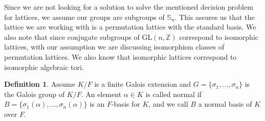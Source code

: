 \documentclass{article}
\theoremstyle{plain}
\theoremstyle{definition}
\newtheorem{definition}[theorem]{Definition}
\newcommand{\Z}{\ensuremath{\mathbb{Z}}}
\newcommand{\Q}{\ensuremath{\mathbb{Q}}}
\begin{document}
Since we are not looking for a solution to solve the mentioned decision problem for lattices, we assume our groups are subgroups of $\mathbb{S}_n$. This assures us that the lattice we are working with is a permutation lattice with the standard basis. We also note that since conjugate subgroups of $\mathrm{GL}(n,\Z)$ correspond to isomorphic lattices, with our assumption we are discussing isomorphism classes of permutation lattices. We also know that isomorphic lattices correspond to isomorphic algebraic tori.
%
%
\begin{definition}
Assume $K/F$ is a finite Galois extension and $G = \lbrace \sigma_1, \ldots , \sigma_n \rbrace$ is the Galois group of $K/F$. An element $\alpha \in K$ is called normal if $B = \lbrace \sigma_1(\alpha), \ldots , \sigma_n(\alpha) \rbrace$ is an $F$-basis for $K$, and we call $B$ a normal basis of $K$ over $F$.
\end{definition} 
\end{document}
